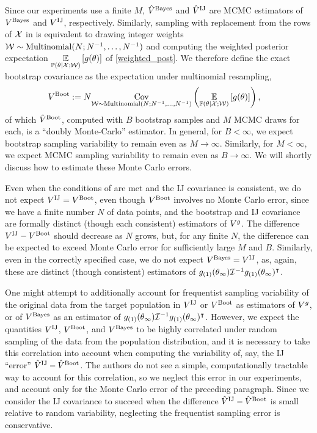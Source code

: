 

Since our experiments use a finite $M$,
$\hat{V}^{\mathrm{Bayes}}$ and $\hat{V}^{\mathrm{IJ}}$ are MCMC estimators of $V^{\mathrm{Bayes}}$ and
$V^{\mathrm{IJ}}$, respectively.  Similarly, sampling with replacement from the rows of
${\mathcal{X}}$ in  is equivalent to drawing integer weights $\mathcal{W} \sim
\mathrm{Multinomial}(N; N^{-1}, \ldots, N^{-1})$ and computing the weighted
posterior expectation $\underset{\mathbb{P}(\theta | {\mathcal{X}}; \mathcal{W})}{\mathbb{E}}\left[g(\theta)\right]$ of \eqref{weighted_post}.
We therefore define the exact bootstrap covariance as the expectation under
multinomial resampling,
%
\begin{align*}
%
\gcovboot :={}& N \cov{\wvec \sim \mathrm{Multinomial}(N; N^{-1}, \ldots, N^{-1})}
    {\expect{\postw}{\g(\theta)}},
%
\end{align*}
%
of which $\hat{V}^{\mathrm{Boot}}$, computed with $B$ bootstrap samples and $M$ MCMC draws
for each, is a ``doubly Monte-Carlo'' estimator.  In general, for $B < \infty$,
we expect bootstrap sampling variability to remain even as $M \rightarrow
\infty$. Similarly, for $M < \infty$, we expect MCMC sampling variability to
remain even as $B \rightarrow \infty$.  We will shortly discuss how to estimate
these Monte Carlo errors.

Even when the conditions of  are met and the IJ covariance
is consistent, we do not expect $V^{\mathrm{IJ}} = V^{\mathrm{Boot}}$, even though $V^{\mathrm{Boot}}$ involves no Monte
Carlo error, since we have a finite number $N$ of data points, and the
bootstrap and IJ covariance are formally distinct (though each consistent)
estimators of $V^g$.  The difference $V^{\mathrm{IJ}} - V^{\mathrm{Boot}}$ should decrease
as $N$ grows, but, for any finite $N$, the difference can be expected to exceed
Monte Carlo error for sufficiently large $M$ and $B$. Similarly, even in the
correctly specified case, we do not expect $V^{\mathrm{Bayes}} = V^{\mathrm{IJ}}$, as, again,
these are distinct (though consistent) estimators of $g_{(1)}(\theta_{\infty})
\mathcal{I}^{-1} g_{(1)}(\theta_{\infty})^\intercal$.

One might attempt to additionally account for frequentist sampling variability
of the original data from the target population in $V^{\mathrm{IJ}}$ or $V^{\mathrm{Boot}}$ as
estimators of $V^g$, or of $V^{\mathrm{Bayes}}$ as an estimator of
$g_{(1)}(\theta_{\infty}) \mathcal{I}^{-1} g_{(1)}(\theta_{\infty})^\intercal$.
However, we expect the quantities $V^{\mathrm{IJ}}$, $V^{\mathrm{Boot}}$, and $V^{\mathrm{Bayes}}$ to be
highly correlated under random sampling of the data from the population
distribution, and it is necessary to take this correlation into account when
computing the variability of, say, the IJ ``error'' $\hat{V}^{\mathrm{IJ}} - \hat{V}^{\mathrm{Boot}}$.
The authors do not see a simple, computationally tractable way to account for
this correlation, so we neglect this error in our experiments, and account only
for the Monte Carlo error of the preceding paragraph.  Since we consider the IJ
covariance  to succeed when the difference $\hat{V}^{\mathrm{IJ}} - \hat{V}^{\mathrm{Boot}}$ is small
relative to random variability, neglecting the frequentist sampling error is
conservative.

